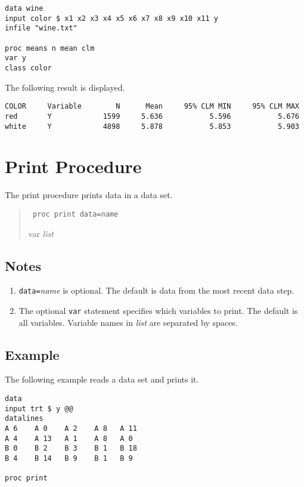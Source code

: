 \documentclass[12pt]{article}
\begin{document}
\begin{Verbatim}
data wine
input color $ x1 x2 x3 x4 x5 x6 x7 x8 x9 x10 x11 y
infile "wine.txt"

proc means n mean clm
var y
class color
\end{Verbatim}

The following result is displayed.

\begin{Verbatim}
COLOR     Variable        N      Mean     95% CLM MIN     95% CLM MAX
red       Y            1599     5.636           5.596           5.676
white     Y            4898     5.878           5.853           5.903
\end{Verbatim}

\newpage

\section{Print Procedure}
The print procedure prints data in a data set.

\begin{quote}
{\tt
proc print data={\it name}

var {\it list}
}
\end{quote}

\subsection*{Notes}
\begin{enumerate}
\item
{\tt data=}{\it name} is optional.
The default is data from the most recent data step.
\item
The optional {\tt var} statement specifies which variables
to print.
The default is all variables.
Variable names in {\it list} are separated by spaces.
\end{enumerate}

\subsection*{Example}
The following example reads a data set
and prints it.

\begin{Verbatim}
data
input trt $ y @@
datalines
A 6    A 0    A 2    A 8   A 11
A 4    A 13   A 1    A 8   A 0
B 0    B 2    B 3    B 1   B 18
B 4    B 14   B 9    B 1   B 9

proc print
\end{Verbatim}
\end{document}
